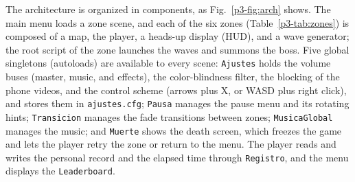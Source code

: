 \documentclass[conference]{IEEEtran}
\begin{document}
The architecture is organized in components, as Fig.~\ref{p3-fig:arch} shows. The main menu loads a zone scene, and each of the six zones (Table~\ref{p3-tab:zones}) is composed of a map, the player, a heads-up display (HUD), and a wave generator; the root script of the zone launches the waves and summons the boss. Five global singletons (autoloads) are available to every scene: \texttt{Ajustes} holds the volume buses (master, music, and effects), the color-blindness filter, the blocking of the phone videos, and the control scheme (arrows plus X, or WASD plus right click), and stores them in \texttt{ajustes.cfg}; \texttt{Pausa} manages the pause menu and its rotating hints; \texttt{Transicion} manages the fade transitions between zones; \texttt{MusicaGlobal} manages the music; and \texttt{Muerte} shows the death screen, which freezes the game and lets the player retry the zone or return to the menu. The player reads and writes the personal record and the elapsed time through \texttt{Registro}, and the menu displays the \texttt{Leaderboard}.
\end{document}
